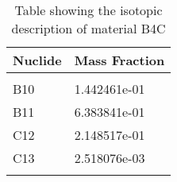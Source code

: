 \begin{centering}
\begin{longtable}[ht!]
\caption{Table showing the isotopic description of material EPPCH}
\label{table:material_EPPCH}
\end{longtable}\clearpage

\begin{longtable}[ht!]
{ p{} | p{} }
\hline
Nuclide & Mass Fraction\\
\hline
\\
B10 & 1.442461e-01\\
B11 & 6.383841e-01\\
C12 & 2.148517e-01\\
C13 & 2.518076e-03\\

\caption{Table showing the isotopic description of material B4C}
\label{table:material_B4C}
\end{longtable}\clearpage


\end{centering}
